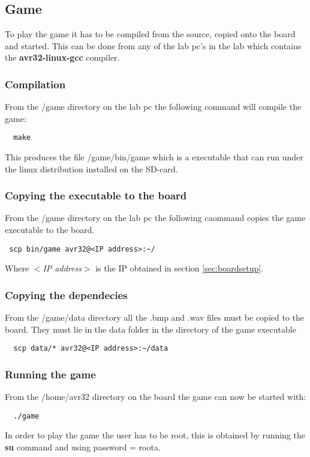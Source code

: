 \subsection{Game}

To play the game it has to be compiled from the source, copied onto the board and started.
This can be done from any of the lab pc's in the lab which contains the {\bf avr32-linux-gcc} compiler.

\subsubsection{Compilation}
From the /game directory on the lab pc the following command will compile the game:
\begin{verbatim}
  make
\end{verbatim}

This produces the file /game/bin/game which is a executable that can run under the linux distribution
installed on the SD-card.

\subsubsection{Copying the executable to the board}
From the /game directory on the lab pc the following caommand copies the game executable to the board.
\begin{verbatim}
 scp bin/game avr32@<IP address>:~/
\end{verbatim}
Where {\it $<$IP address$>$} is the IP obtained in section \ref{sec:boardsetup}.

\subsubsection{Copying the dependecies}
From the /game/data directory all the .bmp and .wav files must be copied to the board. They must
lie in the data folder in the directory of the game executable
\begin{verbatim}
  scp data/* avr32@<IP address>:~/data
\end{verbatim}

\subsubsection{Running the game}
From the /home/avr32 directory on the board the game can now be started with:
\begin{verbatim}
  ./game
\end{verbatim}

In order to play the game the user has to be root, this is obtained by running the {\bf su} command
and using password = roota.
